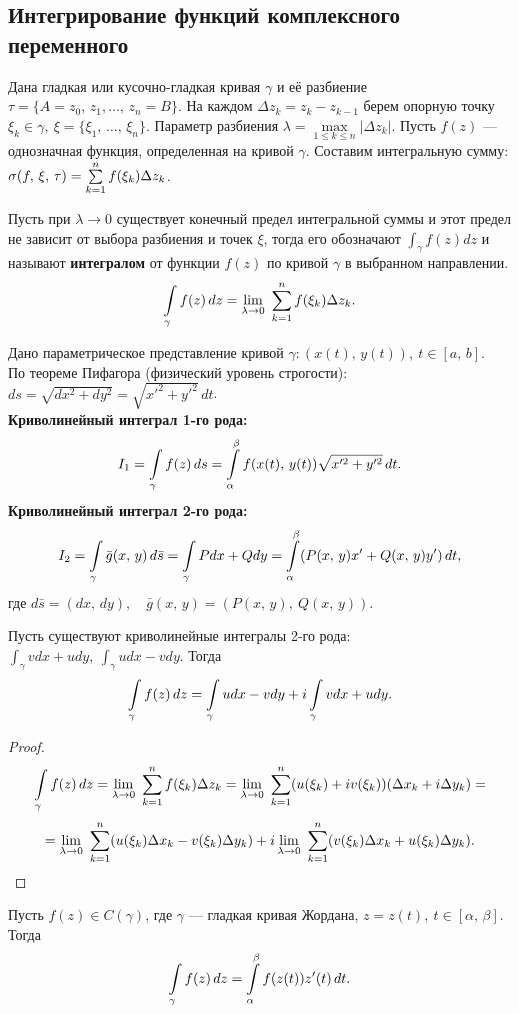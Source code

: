 	\subsection{Интегрирование функций комплексного переменного}
	Дана гладкая или кусочно-гладкая кривая $ \gamma $ и её разбиение $\tau = \{A = z_0,\, z_1, \ldots,\, z_n = B \}$. На каждом $\Delta z_k = z_k - z_{k-1}$ берем опорную точку $\xi_k\in\gamma,\ \xi = \{ \xi_1,\, \ldots,\, \xi_n \}$.
	Параметр разбиения $\lambda = \max\limits_{1\leqslant k 
	\leqslant n}|\Delta z_k|$. Пусть $f(z)$ --- однозначная функция, определенная на кривой $\gamma$. Составим интегральную сумму: $\sigma(f,\,\xi,\,\tau) = \sum\limits_{k=1}^n f(\xi_k)\Delta z_k$.
	\begin{definition}
		Пусть при $\lambda\to0$ существует конечный предел интегральной суммы и этот предел не зависит от выбора разбиения и точек $\xi$, тогда его обозначают $\int_\gamma f(z)dz$ и называют \textbf{интегралом} от функции $f(z)$ по кривой $\gamma$ в выбранном направлении.
		\[ \int\limits_\gamma f(z)\,dz = \lim\limits_{\lambda\to0}\ \sum\limits_{k=1}^n f(\xi_k)\Delta z_k. \]
	\end{definition}
	Дано параметрическое представление кривой $\gamma:(x(t),\,y(t)),\ t\in [a,\,b]$.\\ 
	По теореме Пифагора (физический уровень строгости): $ds = \sqrt{dx^2+dy^2} = \sqrt{x'^2+y'^2}\,dt$.\\
	\textbf{Криволинейный интеграл 1-го рода:}
	\[ I_1 = \int\limits_\gamma f(z)\,ds = \int\limits_\alpha^\beta f(x(t),\,y(t))\sqrt{x'^2+y'^2}\,dt. \]
	\textbf{Криволинейный интеграл 2-го рода:}
	\[ I_2 = \int\limits_\gamma\bar g(x,\,y)\,d\bar s = \int\limits_\gamma Pdx + Qdy = 
	\int\limits_\alpha^\beta (P(x,\,y)x' + Q(x,\,y)y')\,dt, \]
	где $d\bar s = (dx,\, dy),\quad \bar g(x,\,y) = (P(x,\,y),\ Q(x,\,y))$.
	\begin{theorem}
		Пусть существуют криволинейные интегралы 2-го рода: $\int_\gamma vdx + udy,\ \int_\gamma udx - vdy$. Тогда
		\[ \int\limits_\gamma f(z)\,dz = \int\limits_\gamma udx - vdy + i\int\limits_\gamma vdx + udy. \]
	\end{theorem}
	\begin{proof}
		\[ \int\limits_\gamma f(z)\,dz = \lim\limits_{\lambda\rightarrow 0}\ \sum\limits_{k=1}^n f(\xi_k)\Delta z_k = \lim\limits_{\lambda\rightarrow 0}\ \sum\limits_{k=1}^n (u(\xi_k) + iv(\xi_k))(\Delta x_k + i\Delta y_k) = \]
		\[ = \Lim_{\lambda\rightarrow 0}\ \Sum_{k=1}^n(u(\xi_k)\Delta x_k - v(\xi_k)\Delta y_k) + i\Lim_{\lambda\rightarrow 0}\ \Sum_{k=1}^n(v(\xi_k)\Delta x_k + u(\xi_k)\Delta y_k). \]
	\end{proof}
	\begin{theorem}
		Пусть $f(z)\in C(\gamma)$, где $\gamma$ --- гладкая кривая Жордана, $z = z(t),\ t\in [\alpha,\,\beta]$. Тогда
		\[ \int\limits_\gamma f(z)\,dz = \int\limits_\alpha^\beta f(z(t))z'(t)\,dt. \]
	\end{theorem}
